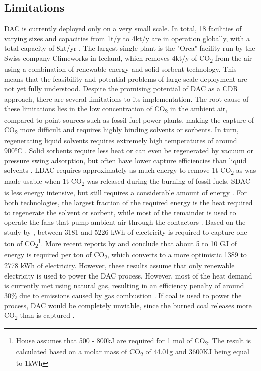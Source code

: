 \subsection*{Limitations}
DAC is currently deployed only on a very small scale. In total, 18 facilities of varying sizes and capacities from 1t/y to 4kt/y are in operation globally, with a total capacity of 8kt/yr \parencite[18]{IEA2022DirectZero}. The largest single plant is the "Orca" facility run by the Swiss company Climeworks in Iceland, which removes 4kt/y of CO\textsubscript{2} from the air using a combination of renewable energy and solid sorbent technology. This means that the feasibility and potential problems of large-scale deployment are not yet fully understood.
Despite the promising potential of DAC as a CDR approach, there are several limitations to its implementation. The root cause of these limitations lies in the low concentration of CO\textsubscript{2} in the ambient air, compared to point sources such as fossil fuel power plants, making the capture of CO\textsubscript{2} more difficult and requires highly binding solvents or sorbents. In turn, regenerating liquid solvents requires extremely high temperatures of around 900°C \parencite[23]{IEA2022DirectZero}. Solid sorbents require less heat or can even be regenerated by vacuum or pressure swing adsorption, but often have lower capture efficiencies than liquid solvents \parencite[192]{NAS2018NegativeAgenda}.
LDAC requires approximately as much energy to remove 1t CO\textsubscript{2} as was made usable when 1t CO\textsubscript{2} was released during the burning of fossil fuels. SDAC is less energy intensive, but still requires a considerable amount of energy \parencite{Linow2022Kurzimpuls-Perspektiven2-Emissionen}. For both technologies, the largest fraction of the required energy is the heat required to regenerate the solvent or sorbent, while most of the remainder is used to operate the fans that pump ambient air through the contactors \parencite[203]{NAS2018NegativeAgenda}. Based on the study by \textcite{House2007ElectrochemicalChange}, between 3181 and 5226 kWh of electricity is required to capture one ton of CO\textsubscript{2}\footnote{House assumes that 500 - 800kJ are required for 1 mol of CO\textsubscript{2}. The result is calculated based on a molar mass of CO\textsubscript{2} of 44.01g and 3600KJ being equal to 1kWh}. More recent reports by \textcite{NAS2018NegativeAgenda} and \textcite{Mulligan2020CarbonShot:States} conclude that about 5 to 10 GJ of energy is required per ton of CO\textsubscript{2}, which converts to a more optimistic 1389 to 2778 kWh of electricity.
However, these results assume that only renewable electricity is used to power the DAC process. However, most of the heat demand is currently met using natural gas, resulting in an efficiency penalty of around 30\% due to emissions caused by gas combustion \parencite{Fuss2018NegativeEffects}. If coal is used to power the process, DAC would be completely unviable, since the burned coal releases more CO\textsubscript{2} than is captured \parencite{Erans2022DirectChallenges, NRC2015ClimateSequestration}.

